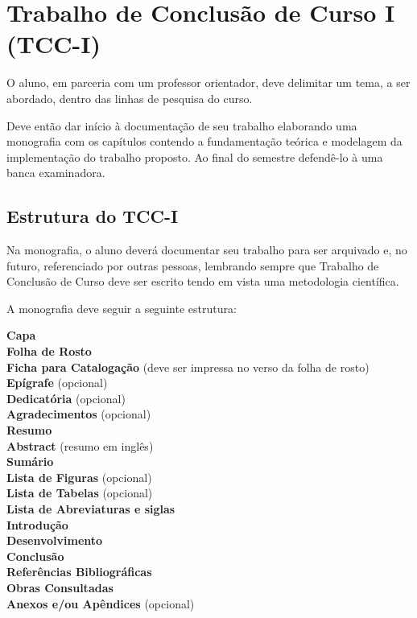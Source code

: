 \section{Trabalho de Conclusão de Curso I (TCC-I)}

O aluno, em parceria com um professor orientador, deve delimitar um tema, a ser abordado, dentro das linhas de pesquisa do curso.

Deve então dar início à documentação de seu trabalho elaborando uma monografia com os capítulos contendo a fundamentação teórica e modelagem da implementação do trabalho proposto. Ao final do semestre defendê-lo à uma banca examinadora.

\subsection{Estrutura do TCC-I}

Na monografia, o aluno deverá documentar seu trabalho para ser arquivado e, no futuro, referenciado por outras pessoas, lembrando sempre que Trabalho de Conclusão de Curso deve ser escrito tendo em vista uma metodologia científica. 

A monografia deve seguir a seguinte estrutura: 
	
	\indent \textbf{Capa} \\
	\indent \textbf{Folha de Rosto} \\
	\indent \textbf{Ficha para Catalogação} (deve ser impressa no verso da folha de rosto) \\
	\indent \textbf{Epígrafe} (opcional) \\
	\indent \textbf{Dedicatória} (opcional) \\
	\indent \textbf{Agradecimentos} (opcional) \\
	\indent \textbf{Resumo} \\
	\indent \textbf{Abstract} (resumo em inglês) \\
	\indent \textbf{Sumário} \\
	\indent \textbf{Lista de Figuras} (opcional) \\
	\indent \textbf{Lista de Tabelas} (opcional) \\
	\indent \textbf{Lista de Abreviaturas e siglas} \\
	\indent \textbf{Introdução} \\
	\indent \textbf{Desenvolvimento} \\
	\indent \textbf{Conclusão} \\
	\indent \textbf{Referências Bibliográficas} \\
	\indent \textbf{Obras Consultadas} \\
	\indent \textbf{Anexos e/ou Apêndices} (opcional) \\\\

